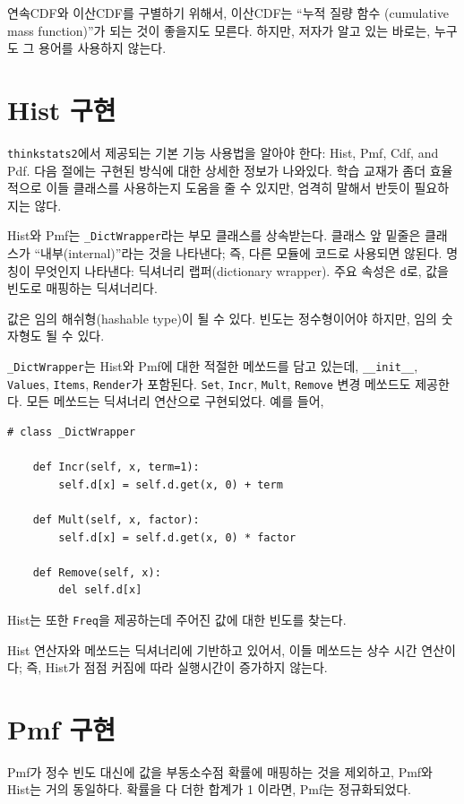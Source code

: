 연속CDF와 이산CDF를 구별하기 위해서, 이산CDF는 
``누적 질량 함수 (cumulative mass function)''가 되는 것이 좋을지도 모른다.
하지만, 저자가 알고 있는 바로는, 누구도 그 용어를 사용하지 않는다.

\section{Hist 구현}

{\tt thinkstats2}에서 제공되는 기본 기능 사용법을 알아야 한다: Hist, Pmf, Cdf, and Pdf.
다음 절에는 구현된 방식에 대한 상세한 정보가 나와있다.
학습 교재가 좀더 효율적으로 이들 클래스를 사용하는지 도움을 줄 수 있지만,
엄격히 말해서 반듯이 필요하지는 않다.

Hist와 Pmf는 \verb"_DictWrapper"라는 부모 클래스를 상속받는다.
클래스 앞 밑줄은 클래스가 ``내부(internal)''라는 것을 나타낸다; 즉,
다른 모듈에 코드로 사용되면 않된다. 명칭이 무엇인지 나타낸다: 
딕셔너리 랩퍼(dictionary wrapper). 
주요 속성은 {\tt d}로, 값을 빈도로 매핑하는 딕셔너리다.


값은 임의 해쉬형(hashable type)이 될 수 있다.
빈도는 정수형이어야 하지만, 임의 숫자형도 될 수 있다.

\verb"_DictWrapper"는 Hist와 Pmf에 대한 적절한 메쏘드를 담고 있는데,
\verb"__init__", {\tt Values}, {\tt Items}, {\tt Render}가 포함된다.
{\tt Set}, {\tt Incr}, {\tt Mult}, {\tt Remove} 변경 메쏘드도 제공한다.
모든 메쏘드는 딕셔너리 연산으로 구현되었다. 예를 들어,

\begin{verbatim}
# class _DictWrapper

    def Incr(self, x, term=1):
        self.d[x] = self.d.get(x, 0) + term

    def Mult(self, x, factor):
        self.d[x] = self.d.get(x, 0) * factor

    def Remove(self, x):
        del self.d[x]
\end{verbatim}

Hist는 또한 {\tt Freq}을 제공하는데 주어진 값에 대한 빈도를 찾는다.

Hist 연산자와 메쏘드는 딕셔너리에 기반하고 있어서, 
이들 메쏘드는 상수 시간 연산이다; 즉, Hist가 점점 커짐에 따라 실행시간이 증가하지 않는다.


\section{Pmf 구현}
Pmf가 정수 빈도 대신에 값을 부동소수점 확률에 매핑하는 것을 제외하고, 
Pmf와 Hist는 거의 동일하다.
확률을 다 더한 합계가 1 이라면, Pmf는 정규화되었다.

